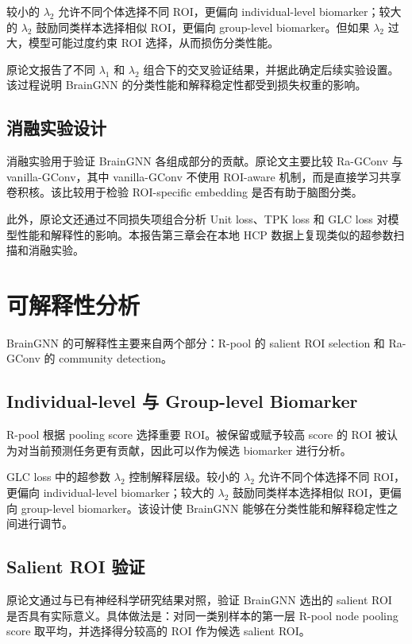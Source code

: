 较小的 $\lambda_2$ 允许不同个体选择不同 ROI，更偏向 individual-level biomarker；较大的 $\lambda_2$ 鼓励同类样本选择相似 ROI，更偏向 group-level biomarker。但如果 $\lambda_2$ 过大，模型可能过度约束 ROI 选择，从而损伤分类性能。

原论文报告了不同 $\lambda_1$ 和 $\lambda_2$ 组合下的交叉验证结果，并据此确定后续实验设置。该过程说明 BrainGNN 的分类性能和解释稳定性都受到损失权重的影响。

\subsection{消融实验设计}

消融实验用于验证 BrainGNN 各组成部分的贡献。原论文主要比较 Ra-GConv 与 vanilla-GConv，其中 vanilla-GConv 不使用 ROI-aware 机制，而是直接学习共享卷积核。该比较用于检验 ROI-specific embedding 是否有助于脑图分类。

此外，原论文还通过不同损失项组合分析 Unit loss、TPK loss 和 GLC loss 对模型性能和解释性的影响。本报告第三章会在本地 HCP 数据上复现类似的超参数扫描和消融实验。

\section{可解释性分析}

BrainGNN 的可解释性主要来自两个部分：R-pool 的 salient ROI selection 和 Ra-GConv 的 community detection。

\subsection{Individual-level 与 Group-level Biomarker}

R-pool 根据 pooling score 选择重要 ROI。被保留或赋予较高 score 的 ROI 被认为对当前预测任务更有贡献，因此可以作为候选 biomarker 进行分析。

GLC loss 中的超参数 $\lambda_2$ 控制解释层级。较小的 $\lambda_2$ 允许不同个体选择不同 ROI，更偏向 individual-level biomarker；较大的 $\lambda_2$ 鼓励同类样本选择相似 ROI，更偏向 group-level biomarker。该设计使 BrainGNN 能够在分类性能和解释稳定性之间进行调节。

\subsection{Salient ROI 验证}

原论文通过与已有神经科学研究结果对照，验证 BrainGNN 选出的 salient ROI 是否具有实际意义。具体做法是：对同一类别样本的第一层 R-pool node pooling score 取平均，并选择得分较高的 ROI 作为候选 salient ROI。

